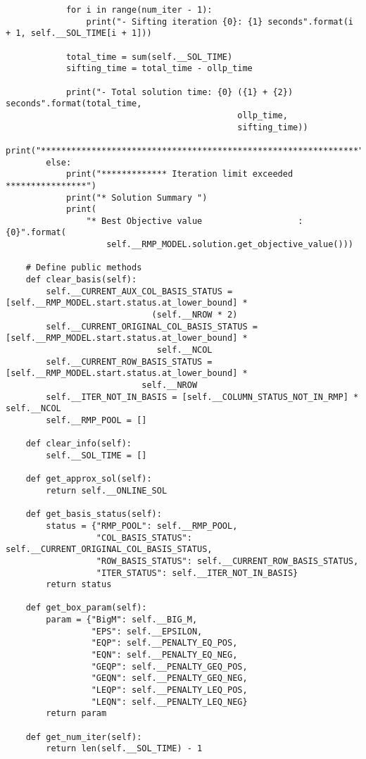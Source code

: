 \documentclass{article}
\begin{document}
\begin{lstlisting}
            for i in range(num_iter - 1):
                print("- Sifting iteration {0}: {1} seconds".format(i + 1, self.__SOL_TIME[i + 1]))

            total_time = sum(self.__SOL_TIME)
            sifting_time = total_time - ollp_time

            print("- Total solution time: {0} ({1} + {2}) seconds".format(total_time, 
            								  ollp_time, 
            								  sifting_time))
            print("***************************************************************")
        else:
            print("************* Iteration limit exceeded ****************")
            print("* Solution Summary ")
            print(
                "* Best Objective value                   : {0}".format(
                    self.__RMP_MODEL.solution.get_objective_value()))

    # Define public methods
    def clear_basis(self):
        self.__CURRENT_AUX_COL_BASIS_STATUS = [self.__RMP_MODEL.start.status.at_lower_bound] *
        					 (self.__NROW * 2)
        self.__CURRENT_ORIGINAL_COL_BASIS_STATUS = [self.__RMP_MODEL.start.status.at_lower_bound] * 
        					  self.__NCOL
        self.__CURRENT_ROW_BASIS_STATUS = [self.__RMP_MODEL.start.status.at_lower_bound] *
        				   self.__NROW
        self.__ITER_NOT_IN_BASIS = [self.__COLUMN_STATUS_NOT_IN_RMP] * self.__NCOL
        self.__RMP_POOL = []

    def clear_info(self):
        self.__SOL_TIME = []

    def get_approx_sol(self):
        return self.__ONLINE_SOL

    def get_basis_status(self):
        status = {"RMP_POOL": self.__RMP_POOL,
                  "COL_BASIS_STATUS": self.__CURRENT_ORIGINAL_COL_BASIS_STATUS,
                  "ROW_BASIS_STATUS": self.__CURRENT_ROW_BASIS_STATUS,
                  "ITER_STATUS": self.__ITER_NOT_IN_BASIS}
        return status

    def get_box_param(self):
        param = {"BigM": self.__BIG_M,
                 "EPS": self.__EPSILON,
                 "EQP": self.__PENALTY_EQ_POS,
                 "EQN": self.__PENALTY_EQ_NEG,
                 "GEQP": self.__PENALTY_GEQ_POS,
                 "GEQN": self.__PENALTY_GEQ_NEG,
                 "LEQP": self.__PENALTY_LEQ_POS,
                 "LEQN": self.__PENALTY_LEQ_NEG}
        return param

    def get_num_iter(self):
        return len(self.__SOL_TIME) - 1


\end{lstlisting}
\end{document}
